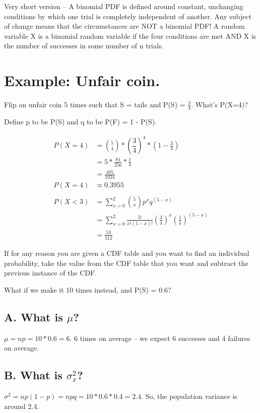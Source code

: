 \documentclass[]{article}
\begin{document}
		Very short version --  A binomial PDF is defined around constant, unchanging conditions by which one trial is completely independent of another. Any subject of change means that the circumstances are NOT a binomial PDF! A random variable X is a binomial random variable if the four conditions are met AND X is the number of successes in some number of n trials.
		
	\section{Example: Unfair coin.}
		Flip an unfair coin 5 times such that S = tails and P(S) = $\frac{3}{4}$. What's P(X=4)?
		
		Define p to be P(S) and q to be P(F) = 1 - P(S).
		
		\begin{align*}
			P(X=4) &= \binom{5}{4} * (\dfrac{3}{4})^4 * (1 - \frac{3}{4}) \\
			       &= 5 * \frac{81}{256} * \frac{1}{4} \\
			       &= \frac{405}{1024} \\
			P(X=4) &\approx 0.3955 \\\\
			P(X<3) &= \sum_{x=0}^{2} \binom{5}{x}p^x q^{(5-x)} \\
			       &= \sum_{x=0}^{2} \frac{5!}{x!(5-x)!} (\frac{3}{4})^x(\frac{1}{4})^{(5-x)} \\
			       &= \frac{53}{512}
		\end{align*}
		
		If for any reason you are given a CDF table and you want to find an individual probability, take the value from the CDF table that you want and subtract the previous instance of the CDF.
		
		\pagebreak
		
		What if we make it 10 times instead, and P(S) = 0.6?
		
		\subsection{A. What is $\mu$?}
			$\mu = np = 10 * 0.6 = 6$.
			6 times on average -- we expect 6 successes and 4 failures on average.
		\subsection{B. What is $\sigma_x^2$?}
			$\sigma^2 = np(1-p) = npq = 10 * 0.6 * 0.4 = 2.4$.
			So, the population variance is around 2.4.
\end{document}
